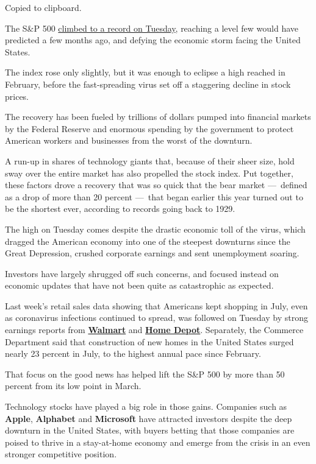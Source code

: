 Copied to clipboard.

The S\&P 500
\href{https://www.nytimes3xbfgragh.onion/2020/08/18/business/stock-market-record.html}{climbed
to a record on Tuesday}, reaching a level few would have predicted a few
months ago, and defying the economic storm facing the United States.

The index rose only slightly, but it was enough to eclipse a high
reached in February, before the fast-spreading virus set off a
staggering decline in stock prices.

The recovery has been fueled by trillions of dollars pumped into
financial markets by the Federal Reserve and enormous spending by the
government to protect American workers and businesses from the worst of
the downturn.

A run-up in shares of technology giants that, because of their sheer
size, hold sway over the entire market has also propelled the stock
index. Put together, these factors drove a recovery that was so quick
that the bear market ---~defined as a drop of more than 20 percent
---~that began earlier this year turned out to be the shortest ever,
according to records going back to 1929.

The high on Tuesday comes despite the drastic economic toll of the
virus, which dragged the American economy into one of the steepest
downturns since the Great Depression, crushed corporate earnings and
sent unemployment soaring.

Investors have largely shrugged off such concerns, and focused instead
on economic updates that have not been quite as catastrophic as
expected.

Last week's retail sales data showing that Americans kept shopping in
July, even as coronavirus infections continued to spread, was followed
on Tuesday by strong earnings reports from
\textbf{\href{https://www.nytimes3xbfgragh.onion/live/2020/08/18/business/stock-market-today-coronavirus/walmarts-e-commerce-sales-jump-by-97-percent}{Walmart}}
and
\textbf{\href{https://www.nytimes3xbfgragh.onion/live/2020/08/18/business/stock-market-today-coronavirus/home-depot-reports-surge-in-second-quarter-sales}{Home
Depot}}. Separately, the Commerce Department said that construction of
new homes in the United States surged nearly 23 percent in July, to the
highest annual pace since February.

That focus on the good news has helped lift the S\&P 500 by more than 50
percent from its low point in March.

Technology stocks have played a big role in those gains. Companies such
as \textbf{Apple}, \textbf{Alphabet} and \textbf{Microsoft} have
attracted investors despite the deep downturn in the United States, with
buyers betting that those companies are poised to thrive in a
stay-at-home economy and emerge from the crisis in an even stronger
competitive position.

